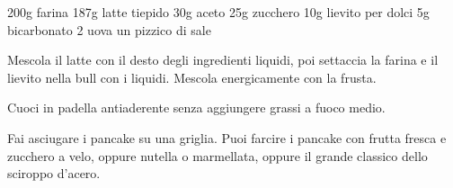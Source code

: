 \begin{ingreds}
	200g farina
	187g latte tiepido
	30g aceto
	25g zucchero
	10g lievito per dolci
	5g bicarbonato
	2 uova
	un pizzico di sale
\end{ingreds}

\begin{method}
	Mescola il latte con il desto degli ingredienti liquidi, poi settaccia la farina e il lievito nella bull con i liquidi. Mescola energicamente con la frusta.

	Cuoci in padella antiaderente senza aggiungere grassi a fuoco medio.

	Fai asciugare i pancake su una griglia. Puoi farcire i pancake con frutta fresca e zucchero a velo, oppure nutella o marmellata, oppure il grande classico dello sciroppo d'acero.
\end {method}



